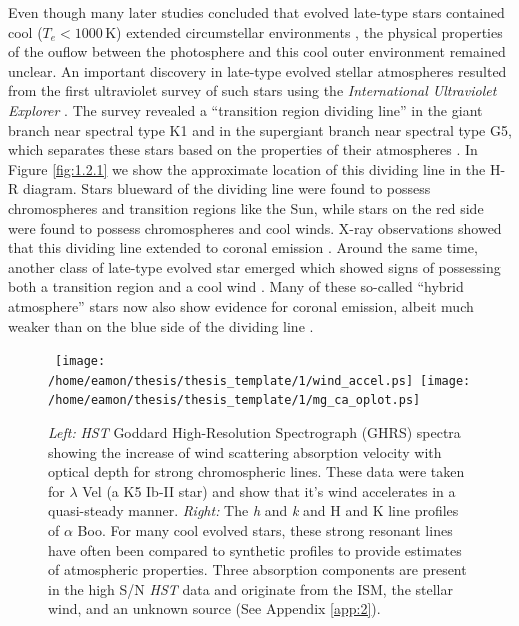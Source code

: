 Even though many later studies concluded that evolved late-type stars contained cool ($T_{e} < 1000$\,K) extended  circumstellar environments \citep[e.g.,][]{weymann_1962,gehrz_1971,bernat_1976,reimers_1975}, the physical properties of the ouflow between the photosphere and this cool outer environment remained unclear. An important discovery in late-type evolved stellar atmospheres resulted from the first ultraviolet survey of such stars using the \textit{International Ultraviolet Explorer} \citep[\textit{IUE};][]{macchetto_1978}. The survey revealed a ``transition region dividing line'' in the giant branch near spectral type K1 and in the supergiant branch near spectral type G5, which separates these stars based on the properties of their atmospheres \citep{linsky_1979, simon_1982}. In Figure \ref{fig:1.2.1} we show the approximate location of this dividing line in the H-R diagram. Stars blueward of the dividing line were found to possess chromospheres and transition regions like the Sun, while stars on the red side were found to possess chromospheres and cool winds. X-ray observations showed that this dividing line extended to coronal emission \citep{ayres_1981}. Around the same time, another class of late-type evolved star emerged which showed signs of possessing both a transition region and a cool wind \citep[e.g.,][]{reimers_1982}. Many of these so-called ``hybrid atmosphere'' stars now also show evidence for coronal emission, albeit much weaker than on the blue side of the dividing line \citep[e.g.,][]{ayres_1997}. 

\begin{figure}[hb!]
\centering 
\mbox{
          \texttt{[image: /home/eamon/thesis/thesis\_template/1/wind\_accel.ps]} 
          \texttt{[image: /home/eamon/thesis/thesis\_template/1/mg\_ca\_oplot.ps]}
          }
\caption[\textit{HST }strong chromospheric lines]{\textit{Left:} \textit{HST} Goddard High-Resolution Spectrograph (GHRS) spectra showing the increase of wind scattering absorption velocity with optical depth for strong chromospheric lines. These data were taken for $\lambda$ Vel (a K5 Ib-II star) and show that it's wind accelerates in a quasi-steady manner. \textit{Right:} The  \textit{h} and \textit{k} and  H and K line profiles of $\alpha$ Boo. For many cool evolved stars, these strong resonant lines have often been compared to synthetic profiles to provide estimates of atmospheric properties. Three absorption components are present in the high S/N \textit{HST} data and originate from the ISM, the stellar wind, and an unknown source (See Appendix \ref{app:2}).}
\label{fig:1.2.2}
\end{figure}

